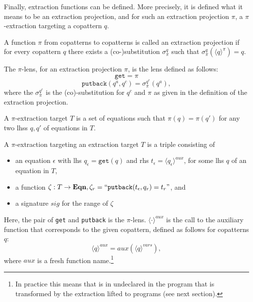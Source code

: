 Finally, extraction functions can be defined. More precisely, it is defined what it means to be an extraction projection, and for such an extraction projection $\pi$, a $\pi$-extraction targeting a copattern $q$.

\begin{definition}
A function $\pi$ from copatterns to copatterns is called an extraction projection if for every copattern $q$ there exists a (co-)substitution $\sigma^q_\pi$ such that $\sigma^q_\pi(\langle q \rangle^\pi) = q$.
\end{definition}

\begin{definition}[$\pi$-lens]
The $\pi$-lens, for an extraction projection $\pi$, is the lens defined as follows:
\[
\mathtt{get} = \pi
\]
\[
\mathtt{putback}(q^a, q^c) = \sigma^{q^c}_\pi(q^a),
\]
where the $\sigma^{q^c}_\pi$ is the (co)-substitution for $q^c$ and $\pi$ as given in the definition of the extraction projection.
\end{definition}

\begin{definition}
A $\pi$-extraction target $T$ is a set of equations such that $\pi(q) = \pi(q')$ for any two lhss $q, q'$ of equations in $T$.
\end{definition}

\begin{definition}
A $\pi$-extraction targeting an extraction target $T$ is a triple consisting of
\begin{itemize}
\item an equation $\epsilon$ with lhs $q_\epsilon = \mathtt{get}(q)$ and rhs $t_\epsilon = \langle q_\epsilon \rangle^{aux}$, for some lhs $q$ of an equation in $T$,
\item a function $\zeta: T \to \mathbf{Eqn}, \zeta_r = ``\mathtt{putback}(t_\epsilon, q_r) = t_r  "$, and
\item a signature $sig$ for the range of $\zeta$
\end{itemize}

Here, the pair of \texttt{get} and \texttt{putback} is the $\pi$-lens. $\langle \cdot \rangle^{aux}$ is the call to the auxiliary function that corresponds to the given copattern, defined as follows for copatterns $q$:
\[
\langle q \rangle^{aux} = aux(\langle q \rangle^{vars}),
\]
where $aux$ is a fresh function name.\footnote{In practice this means that is in undeclared in the program that is transformed by the extraction lifted to programs (see next section).}
\end{definition}

